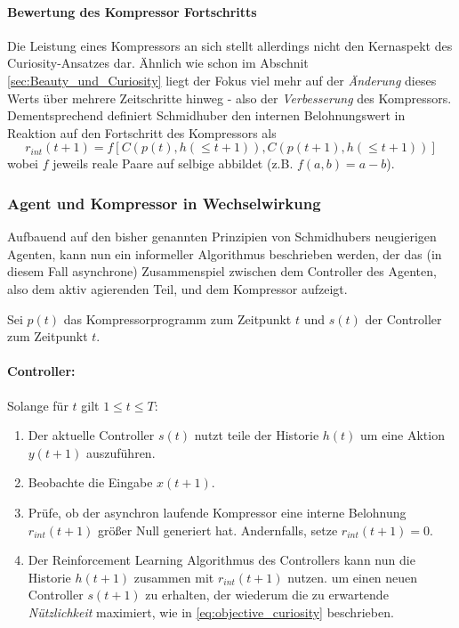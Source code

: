 \paragraph{Bewertung des Kompressor Fortschritts}
Die Leistung eines Kompressors an sich stellt allerdings nicht den Kernaspekt des Curiosity-Ansatzes dar. Ähnlich wie schon im Abschnit \ref{sec:Beauty_und_Curiosity} liegt der Fokus viel mehr auf der \emph{Änderung} dieses Werts über mehrere Zeitschritte hinweg - also der \emph{Verbesserung} des Kompressors.
Dementsprechend definiert Schmidhuber den internen Belohnungswert in Reaktion auf den Fortschritt des Kompressors als 
\begin{equation}
  r_{int}(t+1) = f\left[C(p(t),h(\leq t+1)), C(p(t+1),h(\leq t+1))\right]  
\end{equation}
wobei \(f\) jeweils reale Paare auf selbige abbildet (z.B. \(f(a,b) = a - b\)). \cite[p.~19]{curiosity_schmidhuber}

\subsubsection{Agent und Kompressor in Wechselwirkung}

Aufbauend auf den bisher genannten Prinzipien von Schmidhubers neugierigen Agenten, kann nun ein informeller Algorithmus beschrieben werden, der das (in diesem Fall asynchrone) Zusammenspiel zwischen dem Controller des Agenten, also dem aktiv agierenden Teil, und dem Kompressor aufzeigt.

Sei \(p(t)\) das Kompressorprogramm zum Zeitpunkt \(t\) und \(s(t)\) der Controller zum Zeitpunkt \(t\).

\paragraph{Controller:} Solange für  \(t\) gilt \(1 \leq t \leq T\): 
\begin{enumerate}
  \item Der aktuelle Controller \(s(t)\) nutzt teile der Historie \(h(t)\) um eine Aktion \(y(t+1)\) auszuführen.
  \item Beobachte die Eingabe \(x(t+1)\).
  \item Prüfe, ob der asynchron laufende Kompressor eine interne Belohnung \(r_{int}(t+1)\) größer Null generiert hat. Andernfalls, setze \(r_{int}(t+1) = 0\).
  \item Der Reinforcement Learning Algorithmus des Controllers kann nun die Historie \(h(t+1)\) zusammen mit \(r_{int}(t+1)\) nutzen. um einen neuen Controller \(s(t+1)\) zu erhalten, der wiederum die zu erwartende \emph{Nützlichkeit} maximiert, wie in \eqref{eq:objective_curiosity} beschrieben.
\end{enumerate}

